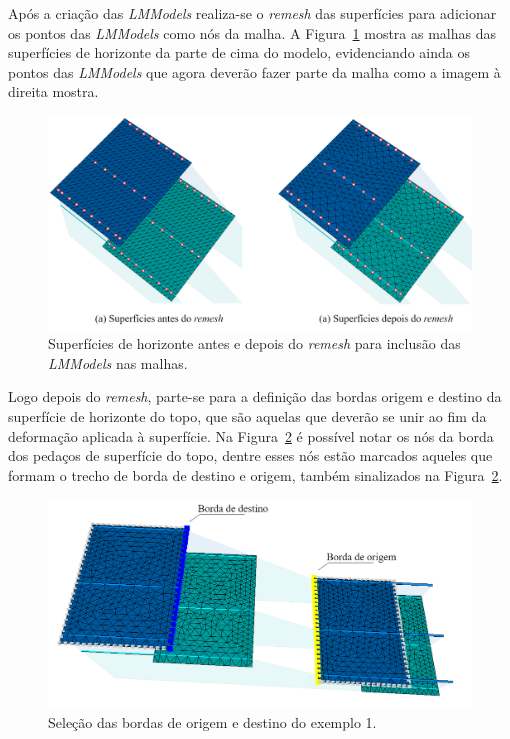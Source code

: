 Após a criação das \textit{LMModels} realiza-se o \textit{remesh} das superfícies para adicionar os pontos das \textit{LMModels} como nós da malha. A Figura~\ref{fig-example-1-3} mostra as malhas das superfícies de horizonte da parte de cima do modelo, evidenciando ainda os pontos das \textit{LMModels} que agora deverão fazer parte da malha como a imagem à direita mostra.

\begin{figure} [H]
  \begin{center}
    \includegraphics[width=\textwidth]{images/fig-example-1-3}
    \caption{Superfícies de horizonte antes e depois do \textit{remesh} para inclusão das \textit{LMModels} nas malhas.}\label{fig-example-1-3}
  \end{center}
\end{figure}

Logo depois do \textit{remesh}, parte-se para a definição das bordas origem e destino da superfície de horizonte do topo, que são aquelas que deverão se unir ao fim da deformação aplicada à superfície. Na Figura~\ref{fig-example-1-4} é possível notar os nós da borda dos pedaços de superfície do topo, dentre esses nós estão marcados aqueles que formam o trecho de borda de destino e origem, também sinalizados na Figura~\ref{fig-example-1-4}.

\begin{figure} [H]
  \begin{center}
    \includegraphics[width=350pt]{images/fig-example-1-4}
    \caption{Seleção das bordas de origem e destino do exemplo 1.}\label{fig-example-1-4}
  \end{center}
\end{figure}

